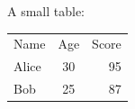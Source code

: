A small table:

\begin{tabular}{lcr}
Name & Age & Score \\
Alice & 30 & 95 \\
Bob & 25 & 87 \\
\end{tabular}
